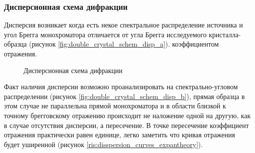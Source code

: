 \subsubsection{Дисперсионная схема дифракции}
  Дисперсия возникает когда есть некое спектральное распределение источника и
   угол Брегга монохроматора отличается от угла Брегга исследуемого кристалла-образца
   (рисунок \ref{fig:double_crystal_schem_disp_a}).
   коэффициентом отражения.
  \begin{figure}[H]
    \centering
    \hfill
    \caption{Дисперсионная схема дифракции}
    \label{ris:double_crystal_schem_disp}
  \end{figure}
  Факт наличия дисперсии возможно проанализировать на спектрально-угловом распределении
  (рисунок \ref{fig:double_crystal_schem_disp_b}), прямая образца в этом случае не параллельна прямой монохроматора и
  в области близкой к точному брегговскому отражению происходит не наложение одной на другую, как в случае отсутствия дисперсии,
  а пересечение. В точке пересечение коэффициент отражения практически равен единице,
  легко заметить что кривая отражения будет уширенной (рисунок \ref{ris:disspersion_curves_expantheory}).
